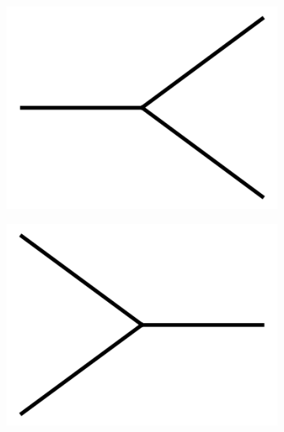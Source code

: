 \documentclass[11pt,a4paper,twoside,pdf]{article}
\numberwithin{equation}{section}
\begin{document}
\begin{figure}[h!]
{{\begin{subfigure}[t]{.08\textwidth}
            \includegraphics[width=\textwidth]{plots/2to1.png}
          \end{subfigure}%
          \begin{subfigure}[t]{.08\textwidth}
            \includegraphics[width=\textwidth]{plots/1to2.png}
          \end{subfigure}%
                    \quad %
          \raisebox{0.9\height}{\LARGE $+$}\quad
          \begin{subfigure}[t]{.08\textwidth}

\end{subfigure}}}
\end{figure}
\end{document}
